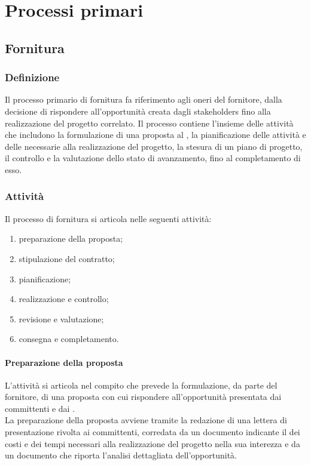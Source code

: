 \chapter{Processi primari}
\section{Fornitura} \label{sec:fornitura}
\subsection{Definizione}
Il processo primario di fornitura fa riferimento agli oneri del fornitore, dalla decisione di rispondere all'opportunità creata dagli stakeholders fino alla realizzazione del progetto correlato. Il processo contiene l'insieme delle attività che includono la formulazione di una proposta al , la pianificazione delle attività e delle  necessarie alla realizzazione del progetto, la stesura di un piano di progetto, il controllo e la valutazione dello stato di avanzamento, fino al completamento di esso.
\subsection{Attività}
Il processo di fornitura si articola nelle seguenti attività:
\begin{enumerate}
    \item preparazione della proposta;
    \item stipulazione del contratto;
    \item pianificazione;
    \item realizzazione e controllo;
    \item revisione e valutazione;
    \item consegna e completamento.
\end{enumerate}

\subsubsection{Preparazione della proposta}
L'attività si articola nel compito che prevede la formulazione, da parte del fornitore, di una proposta con cui rispondere all'opportunità presentata dai committenti e dai .\\
La preparazione della proposta avviene tramite la redazione di una lettera di presentazione rivolta ai committenti, corredata da un documento indicante il  dei costi e dei tempi necessari alla realizzazione del progetto nella sua interezza e da un documento che riporta l'analisi dettagliata dell'opportunità.

